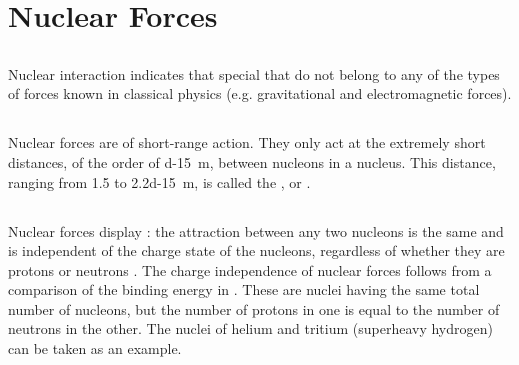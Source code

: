 \section{Nuclear Forces}
\label{sec-42.3} 

\subsection{}\label{42.3.1} 

Nuclear interaction indicates that special  that do not belong to any of the types of forces known in classical physics (e.g. gravitational and electromagnetic forces).

\subsection{}\label{42.3.2}

Nuclear forces are of short-range action. They only act
at the extremely short distances, of the order of \SI{d-15}{\meter}, between nucleons in a nucleus. This distance, ranging from 1.5 to \SI{2.2d-15}{\meter}, is called the , or .

\subsection{}\label{42.3.3}

Nuclear forces display : the attraction between any two nucleons is the same and is independent of the charge state of the nucleons, regardless of whether they are protons or neutrons . The charge independence of nuclear forces follows from a comparison of the binding energy in . These are nuclei having the same total number of nucleons, but the number of protons in one is equal to the number of neutrons in the other. The nuclei of helium  and tritium  (superheavy hydrogen) can be taken as an example.

